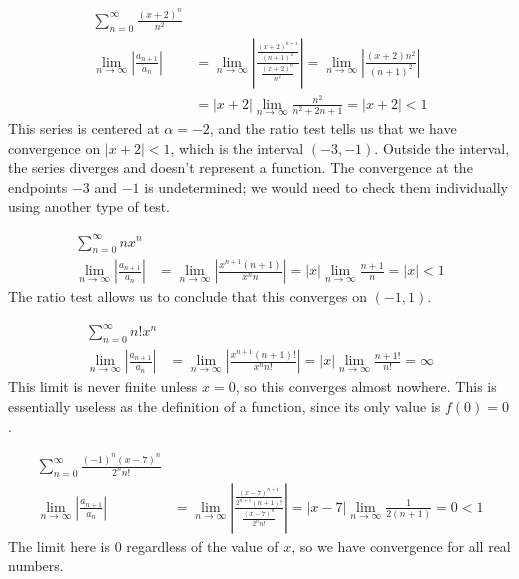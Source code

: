 \documentclass[fleqn,letterpaper]{report}
\begin{document}
\begin{example}
\begin{align*}
\sum_{n=0}^\infty \frac{(x+2)^n}{n^2} & \\
\lim_{n \rightarrow \infty} \left| \frac{a_{n+1}}{a_n} \right| &
= \lim_{n \rightarrow \infty} \left|
\frac{\frac{(x+2)^{n+1}}{(n+1)^2}}{\frac{(x+2)^n}{n^2}} \right| 
= \lim_{n \rightarrow \infty} \left| \frac{(x+2)n^2}{(n+1)^2}
\right| \\
& = |x+2| \lim_{n \rightarrow \infty} \frac{n^2}{n^2+2n+1} =
|x+2| < 1
\end{align*}
This series is centered at $\alpha=-2$, and the ratio test tells us
that we have convergence on $|x+2|<1$, which is the interval
$(-3,-1)$. Outside the interval, the series diverges and
doesn't represent a function. 
The convergence at the endpoints $-3$ and $-1$ is
undetermined; we would need to check them individually using
another type of test.
\end{example}

\begin{example}
\begin{align*}
\sum_{n=0}^\infty nx^n & \\
\lim_{n \rightarrow \infty} \left| \frac{a_{n+1}}{a_n} \right| &
= \lim_{n \rightarrow \infty} \left|
\frac{x^{n+1} (n+1)}{x^n n} \right|
= |x| \lim_{n \rightarrow \infty} \frac{n+1}{n} = |x| < 1
\end{align*}
The ratio test allows us to conclude that this converges on
$(-1,1)$.
\end{example}

\begin{example}
\begin{align*}
\sum_{n=0}^\infty n!x^n & \\
\lim_{n \rightarrow \infty} \left| \frac{a_{n+1}}{a_n} \right| &
= \lim_{n \rightarrow \infty} \left|
\frac{x^{n+1} (n+1)!}{x^n n!} \right| 
= |x| \lim_{n \rightarrow \infty} \frac{n+1!}{n!} = \infty
\end{align*}
This limit is never finite unless $x=0$, so this converges
almost nowhere. This is essentially useless as the definition
of a function, since its only value is $f(0) = 0$.
\end{example}

\begin{example}
\begin{align*}
\sum_{n=0}^\infty \frac{(-1)^n (x-7)^n}{2^n n!} & \\
\lim_{n \rightarrow \infty} \left| \frac{a_{n+1}}{a_n} \right| 
& = \lim_{n \rightarrow \infty} \left|
\frac{\frac{(x-7)^{n+1}}{2^{n+1} (n+1)!}}{\frac{(x-7)^n}{2^n
n!}} \right| = |x-7|\lim_{n \rightarrow \infty}
\frac{1}{2(n+1)} = 0 < 1 
\end{align*}
The limit here is $0$ regardless of the value of $x$, so we have
convergence for all real numbers.
\end{example}
\end{document}
